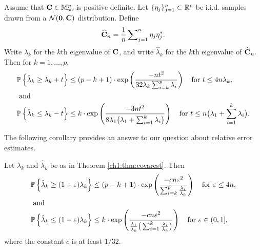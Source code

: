 \begin{thm}
\label{ch1:thm:covarest}
Assume that $\mathbf{C} \in \mathbb{M}^{p}_{\mathrm{sa}}$ is positive definite. Let
$\{\mathbf{\eta}_j\}_{j=1}^n \subset \mathbb{R}^p$ be i.i.d. samples drawn from a
$\mathcal{N}(\mathbf{0}, \mathbf{C})$ distribution. Define 
\[
\widehat{\mathbf{C}}_n = \frac{1}{n} \sum\nolimits_{j=1}^n
\mathbf{\eta}_j\mathbf{\eta}_j^*.
\]
Write $\lambda_k$ for the $k$th eigenvalue of $\mathbf{C}$, and write
$\hat{\lambda}_k$ for the $k$th eigenvalue of $\widehat{\mathbf{C}}_n.$ Then for
$k=1,\ldots,p,$
\begin{align*}
\mathbb{P}\left\{\hat{\lambda}_k \geq \lambda_k + t\right\} & \leq  (p-k+1) \cdot \mathrm{exp}\left(
\displaystyle \frac{-nt^2}{32 \lambda_k \sum_{i=k}^p \lambda_i} \right) \quad
\text{for } t \leq 4 n \lambda_k, \\
\intertext{ and }
\mathbb{P}\left\{\hat{\lambda}_k \leq \lambda_k - t\right\} & \leq  k \cdot \mathrm{exp}\left(
\displaystyle \frac{-3nt^2}{8 \lambda_1 \big(\lambda_1 + \sum_{i=1}^k \lambda_i
\big) } \right) \quad \text{for } t \leq n\big(\lambda_1 + \sum_{i=1}^k
\lambda_i\big).
\end{align*}

\end{thm}

The following corollary provides an answer to our question about relative error
estimates.
\begin{cor}
\label{ch1:cor:relerrcovarest}
Let $\lambda_k$ and $\hat{\lambda}_k$ be as in Theorem \ref{ch1:thm:covarest}. Then 
\begin{align*}
\mathbb{P}\left\{\hat{\lambda}_k \geq (1 + \varepsilon) \lambda_k\right\} & \leq 
(p-k+1) \cdot \mathrm{exp}\left(\frac{- c n \varepsilon^2 }{\sum\nolimits_{i=k}^p
\frac{\lambda_i}{\lambda_k}} \right) \quad \text{for } \varepsilon \leq 4 n, \\
\intertext{ and }
\mathbb{P}\left\{\hat{\lambda}_k  \leq (1 - \varepsilon) \lambda_k\right\} & \leq k \cdot
\mathrm{exp}\left( \frac{-c n \varepsilon^2}{\tfrac{\lambda_1}{\lambda_k}\big(
\sum_{i=1}^k \frac{\lambda_i}{\lambda_k} \big)}
\right) \quad \text{for } \varepsilon \in (0,1],
\end{align*}
where the constant $c$ is at least $1/32.$
\end{cor}

